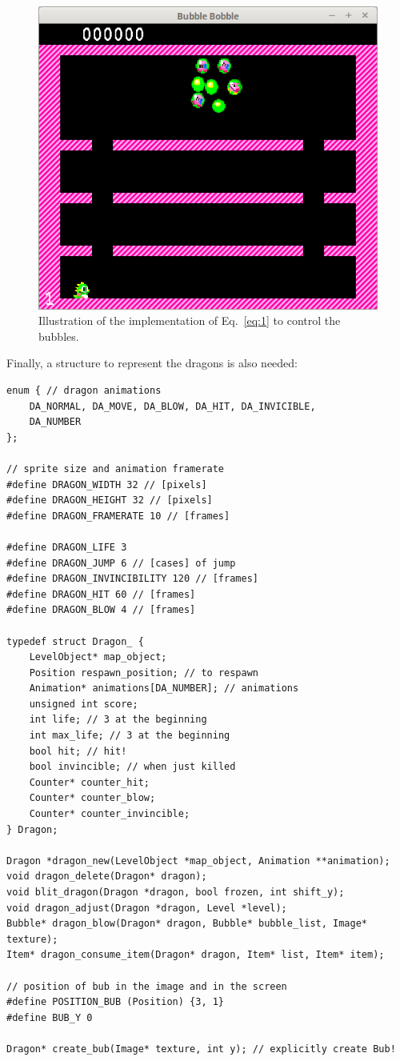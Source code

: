 \documentclass[12pt,a4paper]{article}
\begin{document}
\begin{figure}[!h]
\centering
\includegraphics[width=.6\linewidth]{i/screen6}
\caption{Illustration of the implementation of Eq.~\ref{eq:1} to control the bubbles.}
\label{fig:def:bubs}
\end{figure}

Finally, a structure to represent the dragons is also needed:

\begin{verbatim}
enum { // dragon animations
    DA_NORMAL, DA_MOVE, DA_BLOW, DA_HIT, DA_INVICIBLE,
    DA_NUMBER
};

// sprite size and animation framerate
#define DRAGON_WIDTH 32 // [pixels]
#define DRAGON_HEIGHT 32 // [pixels]
#define DRAGON_FRAMERATE 10 // [frames]

#define DRAGON_LIFE 3
#define DRAGON_JUMP 6 // [cases] of jump
#define DRAGON_INVINCIBILITY 120 // [frames]
#define DRAGON_HIT 60 // [frames]
#define DRAGON_BLOW 4 // [frames]

typedef struct Dragon_ {
    LevelObject* map_object;
    Position respawn_position; // to respawn
    Animation* animations[DA_NUMBER]; // animations
    unsigned int score;
    int life; // 3 at the beginning
    int max_life; // 3 at the beginning
    bool hit; // hit!
    bool invincible; // when just killed
    Counter* counter_hit;
    Counter* counter_blow;
    Counter* counter_invincible;
} Dragon;

Dragon *dragon_new(LevelObject *map_object, Animation **animation);
void dragon_delete(Dragon* dragon);
void blit_dragon(Dragon *dragon, bool frozen, int shift_y);
void dragon_adjust(Dragon *dragon, Level *level);
Bubble* dragon_blow(Dragon* dragon, Bubble* bubble_list, Image* texture);
Item* dragon_consume_item(Dragon* dragon, Item* list, Item* item);

// position of bub in the image and in the screen
#define POSITION_BUB (Position) {3, 1}
#define BUB_Y 0

Dragon* create_bub(Image* texture, int y); // explicitly create Bub!
\end{verbatim}
\end{document}
